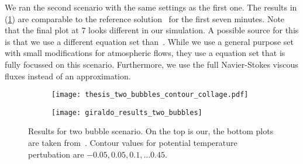 We ran the second scenario with the same \amr{} settings as the first one.
The results in (\cref{fig:results-two-bubbles}) are comparable to the reference solution~\cite{muller2010adaptive} for the first seven minutes.
Note that the final plot at \SI{7}{\min} looks different in our simulation.
A possible source for this is that we use a different equation set than~\cite{muller2010adaptive}.
While we use a general purpose set with small modifications for atmospheric flows, they use a equation set that is fully focussed on this scenario.
Furthermore, we use the full Navier-Stokes viscous fluxes instead of an approximation.

\begin{figure}[p]
  \vspace*{-4.5cm}
  \centering
  \begin{subfigure}{1\textwidth}
    \centering
    \texttt{[image: thesis\_two\_bubbles\_contour\_collage.pdf]}
  \end{subfigure}
  \vspace*{1cm}
  \begin{subfigure}[t]{1\textwidth}
    \centering
    \texttt{[image: giraldo\_results\_two\_bubbles]}
  \end{subfigure}
  \caption{\label{fig:results-two-bubbles}%
    Results for two bubble scenario.
    On the top is our, the bottom plots are taken from~\cite{muller2010adaptive}.
  Contour values for potential temperature pertubation are $-0.05, 0.05, 0.1, \ldots 0.45$.
}
\end{figure}

